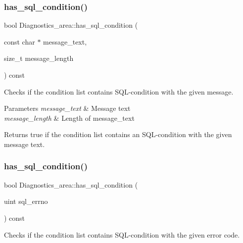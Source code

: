 \subsubsection{\texorpdfstring{has\+\_\+sql\+\_\+condition()}{has\_sql\_condition()}\hspace{0.1cm}{\footnotesize\ttfamily [1/2]}}
{\footnotesize\ttfamily bool Diagnostics\+\_\+area\+::has\+\_\+sql\+\_\+condition (\begin{DoxyParamCaption}\item[{const char $\ast$}]{message\+\_\+text,  }\item[{size\+\_\+t}]{message\+\_\+length }\end{DoxyParamCaption}) const}

Checks if the condition list contains S\+QL-\/condition with the given message.


\begin{DoxyParams}{Parameters}
{\em message\+\_\+text} & Message text \\
\hline
{\em message\+\_\+length} & Length of message\+\_\+text\\
\hline
\end{DoxyParams}
\begin{DoxyReturn}{Returns}
true if the condition list contains an S\+QL-\/condition with the given message text. 
\end{DoxyReturn}
\mbox{\label{classDiagnostics__area_ad7aab3dc281defcc1d92a859b7375896}} 
\subsubsection{\texorpdfstring{has\+\_\+sql\+\_\+condition()}{has\_sql\_condition()}\hspace{0.1cm}{\footnotesize\ttfamily [2/2]}}
{\footnotesize\ttfamily bool Diagnostics\+\_\+area\+::has\+\_\+sql\+\_\+condition (\begin{DoxyParamCaption}\item[{uint}]{sql\+\_\+errno }\end{DoxyParamCaption}) const}

Checks if the condition list contains S\+QL-\/condition with the given error code.


